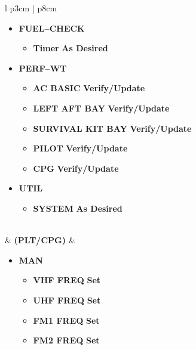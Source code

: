 \documentclass[fontHelvetica]{TechCheck}
\begin{document}
\begin{center}
\begin{longtable}{l p{3cm} | p{8cm}}
\begin{minipage}[t]{\linewidth}
\begin{itemize}
					\item \textbf{FUEL--CHECK}
					\begin{itemize}
						\item \textbf{Timer} \dotfill \textbf{As Desired}
					\end{itemize}
					\item \textbf{PERF--WT}
					\begin{itemize}
						\item \textbf{AC BASIC} \dotfill \textbf{Verify/Update}
						\item \textbf{LEFT AFT BAY} \dotfill \textbf{Verify/Update}
						\item \textbf{SURVIVAL KIT BAY} \dotfill \textbf{Verify/Update}
						\item \textbf{PILOT} \dotfill \textbf{Verify/Update}
						\item \textbf{CPG} \dotfill \textbf{Verify/Update}
					\end{itemize}
					\item \textbf{UTIL}
					\begin{itemize}
						\item \textbf{SYSTEM} \dotfill \textbf{As Desired}
					\end{itemize}
				\end{itemize}
			\end{minipage} \\
			\midrule
			\textbf{\textbullet} &  \textbf{(PLT/CPG)} &
			\begin{minipage}[t]{\linewidth}
				\vspace{-7pt}
				\begin{itemize}
					\item \textbf{MAN}
					\begin{itemize}
						\item \textbf{VHF FREQ} \dotfill \textbf{Set}
						\item \textbf{UHF FREQ} \dotfill \textbf{Set}
						\item \textbf{FM1 FREQ} \dotfill \textbf{Set}
						\item \textbf{FM2 FREQ} \dotfill \textbf{Set}
					\end{itemize}
				\end{itemize}
			\end{minipage} \\
			\bottomrule
		\end{longtable}
	\end{center}

\end{document}
